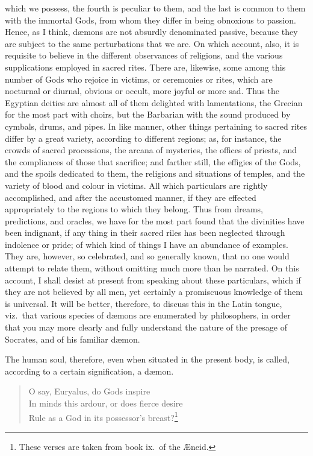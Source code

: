 \documentclass{article}
\begin{document}
which we possess, the fourth is peculiar to them, and the last is common to
them with the immortal Gods, from whom they differ in being obnoxious to
passion. Hence, as I think, d{\ae}mons are not absurdly denominated passive,
because they are subject to the same perturbations that we are. On which
account, also, it is requisite to believe in the different observances of
religions, and the various supplications employed in sacred rites. There are,
likewise, some among this number of Gods who rejoice in victims, or ceremonies
or rites, which are nocturnal or diurnal, obvious or occult, more joyful or
more sad. Thus the Egyptian deities are almost all of them delighted with
lamentations, the Grecian for the most part with choirs, but the Barbarian with
the sound produced by cymbals, drums, and pipes. In like manner, other things
pertaining to sacred rites differ by a great variety, according to different
regions; as, for instance, the crowds of sacred processions, the arcana of
mysteries, the offices of priests, and the compliances of those that sacrifice;
and farther still, the effigies of the Gods, and the spoils dedicated to them,
the religions and situations of temples, and the variety of blood and colour in
victims. All which particulars are rightly accomplished, and after the
accustomed manner, if they are effected appropriately to the regions to which
they belong. Thus from dreams, predictions, and oracles, we have for the most
part found that the divinities have been indignant, if any thing in their
sacred riles has been neglected through indolence or pride; of which kind of
things I have an abundance of examples. They are, however, so celebrated, and
so generally known, that no one would attempt to relate them, without omitting
much more than he narrated.  On this account, I shall desist at present from
speaking about these particulars, which if they are not believed by all men,
yet certainly a promiscuous knowledge of them is universal. It will be better,
therefore, to discuss this in the Latin tongue, viz.~that various species of
d{\ae}mons are enumerated by philosophers, in order that you may more clearly
and fully understand the nature of the presage of Socrates, and of his familiar
d{\ae}mon.

The human soul, therefore, even when situated in the present body, is called,
according to a certain signification, a d{\ae}mon.

\begin{verse}
O say, Euryalus, do Gods inspire\\
In minds this ardour, or does fierce desire\\
Rule as a God in its possessor's breast?\footnote{These verses are taken from
book ix.~of the {\AE}neid.}
\end{verse}
\end{document}
